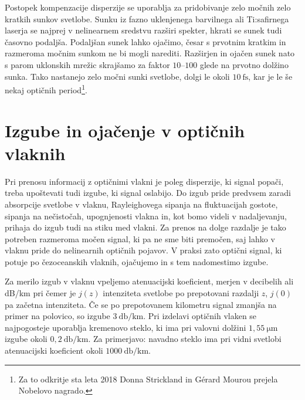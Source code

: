 \begin{remark}
Postopek kompenzacije disperzije se uporablja za pridobivanje zelo močnih zelo
kratkih sunkov svetlobe. Sunku iz fazno uklenjenega barvilnega 
ali Ti:safirnega
laserja se najprej v nelinearnem sredstvu razširi spekter, hkrati
se sunek tudi časovno podaljša. Podaljšan sunek lahko ojačimo, česar 
s prvotnim kratkim in razmeroma močnim sunkom ne bi mogli narediti. Razširjen
in ojačen sunek nato s parom uklonskih mrežic skrajšamo za 
faktor $10$--$100$ glede na prvotno dolžino sunka. Tako nastanejo zelo močni sunki
svetlobe, dolgi le okoli $10~\si{\femto\second}$, kar je le še nekaj optičnih 
period\footnote{Za to odkritje sta leta 2018 Donna Strickland in
G\'erard Mourou prejela Nobelovo nagrado.}.
\end{remark}

\section{Izgube in ojačenje v optičnih vlaknih}
Pri prenosu informacij z optičnimi vlakni je poleg disperzije, ki signal popači,
treba upoštevati tudi izgube, ki signal oslabijo. 
Do izgub pride predvsem zaradi absorpcije svetlobe v vlaknu,
Rayleighovega sipanja na fluktuacijah gostote, 
sipanja na nečistočah, upognjenosti vlakna in, kot bomo videli v
nadaljevanju, prihaja do izgub tudi na stiku med vlakni. Za prenos na dolge
razdalje je tako potreben razmeroma močen signal, ki pa ne sme biti premočen,
saj lahko v vlaknu pride do nelinearnih optičnih pojavov. V praksi zato 
optični signal, ki potuje po čezoceanskih vlaknih, ojačujemo in s tem nadomestimo
izgube.

Za merilo izgub v vlaknu vpeljemo atenuacijski 
koeficient, merjen v decibelih ali dB/km
pri čemer je $j(z)$ intenziteta svetlobe po prepotovani razdalji $z$, $j(0)$ pa
začetna intenziteta. Če se po prepotovanem
kilometru signal zmanjša na primer na polovico, so izgube $3~\si{\decibel/\kilo\meter}$.
Pri izdelavi optičnih vlaken se najpogosteje uporablja kremenovo steklo, ki 
ima pri valovni dolžini $1,55~\si{\micro\meter}$ izgube okoli 
$0,2~\si{\decibel/\kilo\meter}$.  
Za primerjavo: navadno steklo ima pri vidni svetlobi atenuacijski koeficient okoli 
$1000~\si{\decibel/\kilo\meter}$.

